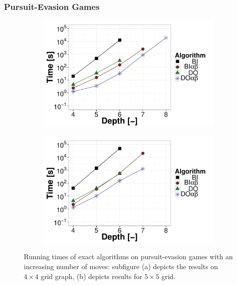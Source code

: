 \subsubsection{Pursuit-Evasion Games}
\begin{figure}
\centering
	\begin{subfigure}{0.49\textwidth}
		\includegraphics[width=1\textwidth]{figures/PEG4x4.pdf}\caption{}\label{fig:off:res:peg4}
	\end{subfigure}
	\begin{subfigure}{0.49\textwidth}
		\includegraphics[width=1\textwidth]{figures/PEG5x5.pdf}\caption{}\label{fig:off:res:peg5}
	\end{subfigure}
\caption{Running times of exact algorithms on pursuit-evasion games with an increasing number of moves: subfigure (a) depicts the results on $4\times4$ grid graph, (b) depicts results for $5\times5$ grid.} \label{fig:off:res:peg}
\end{figure}

